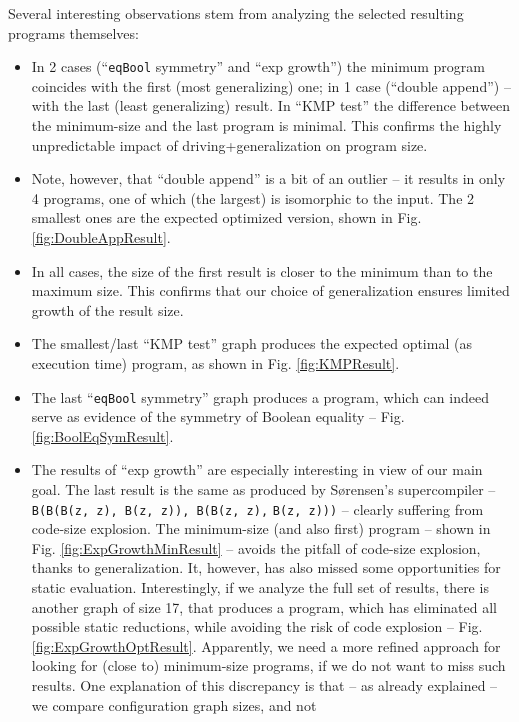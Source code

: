 \documentclass[submission,copyright,creativecommons]{eptcs}
\begin{document}
Several interesting observations stem from analyzing the selected resulting programs themselves:
\begin{itemize}
  \item In 2 cases (``\verb|eqBool| symmetry'' and ``exp growth'') the minimum program coincides with the first (most generalizing) one;
    in 1 case (``double append'') -- with the last (least generalizing) result. 
    In ``KMP test'' the difference between the minimum-size and the last program is minimal.
    This confirms the highly unpredictable impact of driving+generalization on program size.
  \item Note, however, that ``double append'' is a bit of an outlier -- it results in only 4 programs,
    one of which (the largest) is isomorphic to the input. The 2 smallest ones are the expected
    optimized version, shown in Fig. \ref{fig:DoubleAppResult}.
  \item In all cases, the size of the first result is closer to the minimum than to the maximum size.
    This confirms that our choice of generalization ensures limited growth of the result size.
  \item The smallest/last ``KMP test'' graph produces the expected optimal (as execution time) program,
    as shown in Fig. \ref{fig:KMPResult}.
  \item The last ``\verb|eqBool| symmetry'' graph produces a program, which can indeed serve as evidence of the
    symmetry of Boolean equality -- Fig. \ref{fig:BoolEqSymResult}.
  \item The results of ``exp growth'' are especially interesting in view of our main goal.
    The last result is the same as produced by S{\o}rensen's supercompiler --
    \verb|B(B(B(z, z), B(z, z)), B(B(z, z),| \verb|B(z, z)))| -- clearly suffering from code-size explosion.
    The minimum-size (and also first) program -- shown in Fig. \ref{fig:ExpGrowthMinResult} --
    avoids the pitfall of code-size explosion, thanks to generalization.
    It, however, has also missed some opportunities for static evaluation.
    Interestingly, if we analyze the full set of results, there is another
    graph of size 17, that produces a program, which has eliminated all possible static reductions,
    while avoiding the risk of code explosion -- Fig. \ref{fig:ExpGrowthOptResult}.
    Apparently, we need a more refined approach for looking for (close to) minimum-size programs, 
    if we do not want to miss such results.
    One explanation of this discrepancy is that -- as already explained -- we compare configuration graph sizes, and not

\end{itemize}
\end{document}
